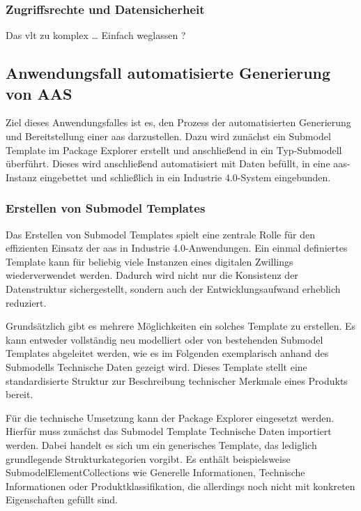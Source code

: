 \subsubsection{Zugriffsrechte und Datensicherheit}
Das vlt zu komplex \dots
Einfach weglassen ? 


\newpage
\subsection{Anwendungsfall automatisierte Generierung von AAS}
Ziel dieses Anwendungsfalles ist es, den Prozess der automatisierten Generierung und Bereitstellung einer \acs{aas} darzustellen.
Dazu wird zunächst ein Submodel Template im Package Explorer erstellt und anschließend in ein Typ-Submodell überführt.
Dieses wird anschließend automatisiert mit Daten befüllt, in eine \acs{aas}-Instanz eingebettet und schließlich in ein Industrie 4.0-System eingebunden.

\subsubsection{Erstellen von Submodel Templates}
\label{chap:ErstellenvonSubmodelTemplates}
Das Erstellen von Submodel Templates spielt eine zentrale Rolle für den effizienten Einsatz der \acs{aas} in Industrie 4.0-Anwendungen. 
Ein einmal definiertes Template kann für beliebig viele Instanzen eines digitalen Zwillings wiederverwendet werden. 
Dadurch wird nicht nur die Konsistenz der Datenstruktur sichergestellt, sondern auch der Entwicklungsaufwand erheblich reduziert.

Grundsätzlich gibt es mehrere Möglichkeiten ein solches Template zu erstellen.
Es kann entweder vollständig neu modelliert oder von bestehenden Submodel Templates abgeleitet werden, wie es im Folgenden exemplarisch anhand des Submodells Technische Daten \cite{SpezifikaitonTechnischeDaten} gezeigt wird.
Dieses Template stellt eine standardisierte Struktur zur Beschreibung technischer Merkmale eines Produkts bereit.

Für die technische Umsetzung kann der Package Explorer eingesetzt werden.
Hierfür muss zunächst das Submodel Template Technische Daten importiert werden.
Dabei handelt es sich um ein generisches Template, das lediglich grundlegende Strukturkategorien vorgibt.
Es enthält beispielsweise SubmodelElementCollections wie Generelle Informationen, Technische Informationen oder Produktklassifikation, die allerdings noch nicht mit konkreten Eigenschaften gefüllt sind.

